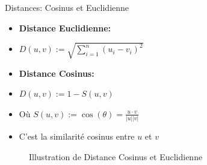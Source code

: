 \documentclass{beamer}
\begin{document}



\begin{frame}{Distances: Cosinus et Euclidienne}
\begin{minipage}{0.55\textwidth}
\begin{itemize}
\setlength\itemsep{1em} %
\item \textbf{Distance Euclidienne:}
\item[] $D(u, v) := \sqrt{\sum_{i=1}^{n} (u_i - v_i)^2}$
\item \textbf{Distance Cosinus:}
\item[] $D(u, v) :=1-S(u, v)$
\item[] Où $S(u, v) := \cos(\theta)=\frac{u \cdot v}{|u||v|}$
\item[] C'est la similarité cosinus entre $u$ et $v$
\end{itemize}
\end{minipage}
\hfill
\begin{minipage}{0.4\textwidth}
\begin{figure}
\centering

\caption{Illustration de Distance Cosinus et Euclidienne}
\end{figure}
\end{minipage}
\end{frame}
\end{document}
